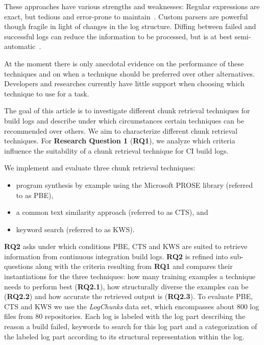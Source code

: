 These approaches have various strengths and weaknesses: Regular
expressions are exact, but tedious and error-prone to
maintain~\cite{michael2019regexes}.  Custom parsers are powerful
though fragile in light of changes in the log structure. Diffing
between failed and successful logs can reduce the information to be
processed, but is at best semi-automatic~\cite{amar2019mining}.

At the moment there is only anecdotal evidence on the performance of these techniques and on when a technique should be preferred over other alternatives.
Developers and researches currently have little support when choosing which technique to use for a task.

The goal of this article is to investigate different chunk retrieval techniques for build logs and describe under which circumstances certain techniques can be recommended over others.
We aim to characterize different chunk retrieval techniques.
For \textbf{Research Question 1} (\textbf{RQ1}), we analyze which criteria influence the suitability of a chunk retrieval technique for CI build logs.

We implement and evaluate three chunk retrieval techniques:
\begin{itemize}
  \item program synthesis by example using the Microsoft PROSE library (referred to as PBE),
  \item a common text similarity approach (referred to as CTS), and
  \item keyword search (referred to as KWS).
\end{itemize}

\textbf{RQ2} asks under which conditions PBE, CTS and KWS are suited to retrieve information from continuous integration build logs.
\textbf{RQ2} is refined into sub-questions along with the criteria resulting from \textbf{RQ1} and compares their instantiations for the three techniques:
how many training examples a technique needs to perform best (\textbf{RQ2.1}), how structurally diverse the examples can be (\textbf{RQ2.2}) and how accurate the retrieved output is (\textbf{RQ2.3}).
To evaluate PBE, CTS and KWS we use the \emph{LogChunks} data set, which encompasses about 800 log files from 80 repositories.
Each log is labeled with the log part describing the reason a build failed, keywords to search for this log part and a categorization of the labeled log part according to its structural representation within the log.


